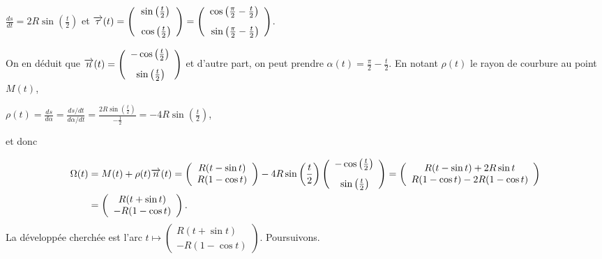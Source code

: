 {\begin{enumerate}
{\begin{center}
$\frac{ds}{dt}=2R\sin\left(\frac{t}{2}\right)$ et $\overrightarrow{\tau}(t)=\left(
\begin{array}{c}
\sin\left(\frac{t}{2}\right)\\
\rule{0mm}{6mm}\cos\left(\frac{t}{2}\right)
\end{array}
\right)=\left(
\begin{array}{c}
\cos\left(\frac{\pi}{2}-\frac{t}{2}\right)\\
\rule{0mm}{6mm}\sin\left(\frac{\pi}{2}-\frac{t}{2}\right)
\end{array}
\right)$.
\end{center}
On en déduit que $\overrightarrow{n}(t)=\left(
\begin{array}{c}
-\cos\left(\frac{t}{2}\right)\\
\rule{0mm}{6mm}\sin\left(\frac{t}{2}\right)
\end{array}
\right)$ et d'autre part, on peut prendre $\alpha(t)=\frac{\pi}{2}-\frac{t}{2}$. En notant $\rho(t)$ le rayon de courbure au point $M(t)$,

\begin{center}
$\rho(t)=\frac{ds}{d\alpha}=\frac{ds/dt}{d\alpha/dt}=\frac{2R\sin\left(\frac{t}{2}\right)}{-\frac{1}{2}}=-4R\sin\left(\frac{t}{2}\right)$,
\end{center}
et donc

\begin{align*}\ensuremath
\Omega(t)&=M(t)+\rho(t)\overrightarrow{n}(t)=\left(
\begin{array}{c}
R(t-\sin t)\\
R(1-\cos t)
\end{array}
\right)-4R\sin\left(\frac{t}{2}\right)\left(
\begin{array}{c}
-\cos\left(\frac{t}{2}\right)\\
\rule{0mm}{6mm}\sin\left(\frac{t}{2}\right)
\end{array}
\right)=\left(
\begin{array}{c}
R(t-\sin t)+2R\sin t\\
R(1-\cos t)-2R(1-\cos t)
\end{array}
\right)\\
 &=\left(
\begin{array}{c}
R(t+\sin t)\\
-R(1-\cos t)
\end{array}
\right).
\end{align*}
La développée cherchée est l'arc $t\mapsto\left(
\begin{array}{c}
R(t+\sin t)\\
-R(1-\cos t)
\end{array}
\right)$. Poursuivons.

}
\end{enumerate}}
